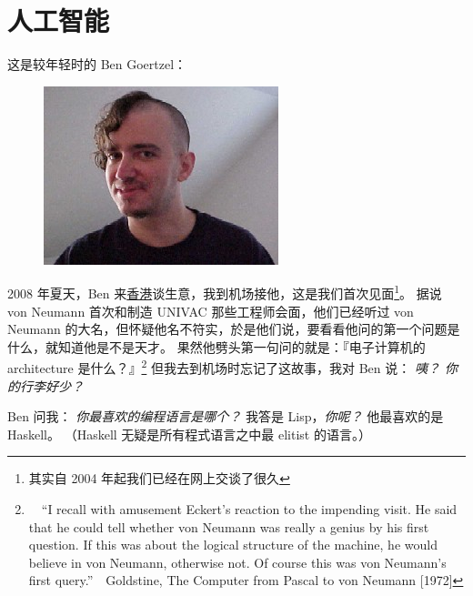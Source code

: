 \documentclass[12pt]{report}
\newcommand{\cc}[2]{#1}
\newcommand{\cc}[2]{#2}
\newcommand{\speechCn}[1]{\textrm{\textit{\textcolor{Speech}{#1}}}}
\newcommand*\dashh{\,\,\textemdash\kern-1pt\textemdash\,\,}
\begin{document}
{

\chapter{\cc{人工智能}{Artificial intelligence}}

\cc{
这是较年轻时的 Ben Goertzel：
}{
	
}
\begin{figure}[H]
\centering
\includegraphics[scale=2.5]{benbenben.jpg}
\end{figure}

\cc{
2008 年夏天，Ben 来\uline{香港}谈生意，我到机场接他，这是我们首次见面\footnote{其实自 2004 年起我们已经在网上交谈了很久}。 据说 von Neumann 首次和制造 UNIVAC 那些工程师会面，他们已经听过 von Neumann 的大名，但怀疑他名不符实，於是他们说，要看看他问的第一个问题是什么，就知道他是不是天才。  果然他劈头第一句问的就是：『电子计算机的 architecture 是什么？』\footnote{\ \  ``I recall with amusement Eckert's reaction to the impending visit. He said that he could tell whether von Neumann was really a genius by his first question. If this was about the logical structure of the machine, he would believe in von Neumann, otherwise not. Of course this was von Neumann's first query.'' \dashh Goldstine, The Computer from Pascal to von Neumann [1972]}  但我去到机场时忘记了这故事，我对 Ben 说： \speechCn{咦？ 你的行李好少？}
}{
	
}

\cc{
Ben 问我： \speechCn{你最喜欢的编程语言是哪个？} 我答是 Lisp，\speechCn{你呢？} 他最喜欢的是 Haskell。 （Haskell 无疑是所有程式语言之中最 elitist 的语言。）
}{
	
}}
\end{document}
